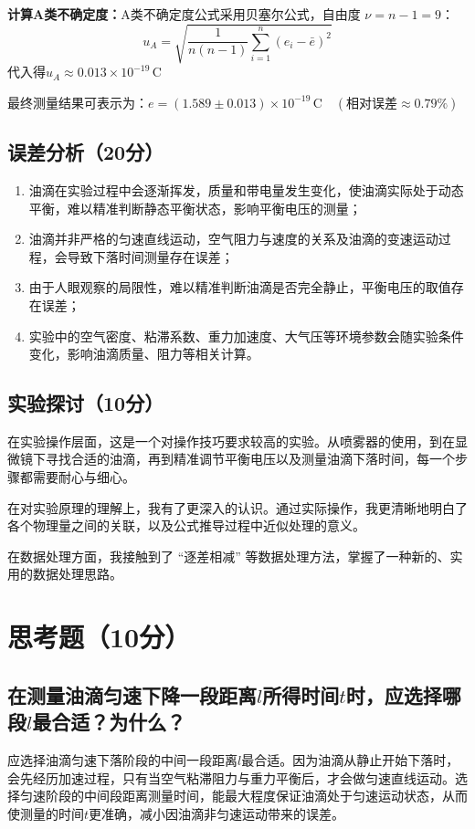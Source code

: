 \documentclass[]{../template/Report}%
\begin{document}
\begin{fullreportonly}
\vspace{2mm}
\textbf{计算A类不确定度：}A类不确定度公式采用贝塞尔公式，自由度 \( \nu = n-1 = 9 \)：
\[u_A = \sqrt{\frac{1}{n(n-1)} \sum_{i=1}^n (e_i - \bar{e})^2}\]
代入得$u_A \approx 0.013 \times 10^{-19} \, \text{C}$

\vspace{2mm}
最终测量结果可表示为：\(e = (1.589 \pm 0.013) \times 10^{-19} \, \text{C} \quad (\text{相对误差} \approx 0.79\%)\)
\subsection{误差分析（20分）}
\begin{enumerate}
    \item 油滴在实验过程中会逐渐挥发，质量和带电量发生变化，使油滴实际处于动态平衡，难以精准判断静态平衡状态，影响平衡电压的测量；
    \item 油滴并非严格的匀速直线运动，空气阻力与速度的关系及油滴的变速运动过程，会导致下落时间测量存在误差；
    \item 由于人眼观察的局限性，难以精准判断油滴是否完全静止，平衡电压的取值存在误差；
    \item 实验中的空气密度、粘滞系数、重力加速度、大气压等环境参数会随实验条件变化，影响油滴质量、阻力等相关计算。
\end{enumerate}

\subsection{实验探讨（10分）}
在实验操作层面，这是一个对操作技巧要求较高的实验。从喷雾器的使用，到在显微镜下寻找合适的油滴，再到精准调节平衡电压以及测量油滴下落时间，每一个步骤都需要耐心与细心。

\vspace{2mm}
在对实验原理的理解上，我有了更深入的认识。通过实际操作，我更清晰地明白了各个物理量之间的关联，以及公式推导过程中近似处理的意义。

\vspace{2mm}
在数据处理方面，我接触到了 “逐差相减” 等数据处理方法，掌握了一种新的、实用的数据处理思路。

\section{思考题（10分）}
\subsection{在测量油滴匀速下降一段距离$l$所得时间$t$时，应选择哪段$l$最合适？为什么？}
应选择油滴匀速下落阶段的中间一段距离$l$最合适。因为油滴从静止开始下落时，会先经历加速过程，只有当空气粘滞阻力与重力平衡后，才会做匀速直线运动。选择匀速阶段的中间段距离测量时间，能最大程度保证油滴处于匀速运动状态，从而使测量的时间$t$更准确，减小因油滴非匀速运动带来的误差。

\end{fullreportonly}
\end{document}
